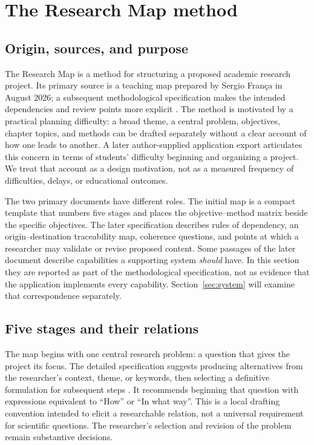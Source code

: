 \section{The Research Map method}
\label{sec:method}

\subsection{Origin, sources, and purpose}

The Research Map is a method for structuring a proposed academic research project. Its primary source is a teaching map prepared by Sergio Fran\c{c}a in August 2026; a subsequent methodological specification makes the intended dependencies and review points more explicit \cite{franca2026map,franca2026detail}. The method is motivated by a practical planning difficulty: a broad theme, a central problem, objectives, chapter topics, and methods can be drafted separately without a clear account of how one leads to another. A later author-supplied application export articulates this concern in terms of students' difficulty beginning and organizing a project. We treat that account as a design motivation, not as a measured frequency of difficulties, delays, or educational outcomes.

The two primary documents have different roles. The initial map is a compact template that numbers five stages and places the objective--method matrix beside the specific objectives. The later specification describes rules of dependency, an origin--destination traceability map, coherence questions, and points at which a researcher may validate or revise proposed content. Some passages of the later document describe capabilities a supporting system \emph{should} have. In this section they are reported as part of the methodological specification, not as evidence that the application implements every capability. Section~\ref{sec:system} will examine that correspondence separately.

\subsection{Five stages and their relations}

The map begins with one central research problem: a question that gives the project its focus. The detailed specification suggests producing alternatives from the researcher's context, theme, or keywords, then selecting a definitive formulation for subsequent steps \cite{franca2026detail}. It recommends beginning that question with expressions equivalent to ``How'' or ``In what way''. This is a local drafting convention intended to elicit a researchable relation, not a universal requirement for scientific questions. The researcher's selection and revision of the problem remain substantive decisions.

